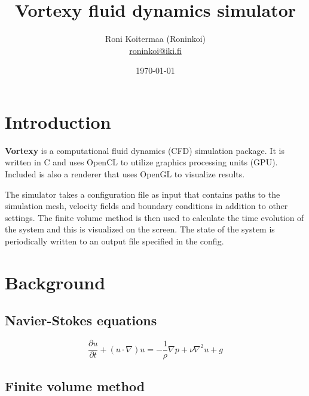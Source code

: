 \documentclass[12pt]{article}
\title {
  Vortexy fluid dynamics simulator
}
\date{\today}
\author {
  Roni Koitermaa (Roninkoi) \\
  \href{mailto:roninkoi@iki.fi}{roninkoi@iki.fi}
}
\begin{document}
\setlength{\belowcaptionskip}{10pt}


\normalsize

\maketitle

\newpage

\tableofcontents

\newpage

\section{Introduction}

{\bf Vortexy} is a computational fluid dynamics (CFD) simulation package. It is written in C and uses OpenCL to utilize graphics processing units (GPU). Included is also a renderer that uses OpenGL to visualize results.

The simulator takes a configuration file as input that contains paths to the simulation mesh, velocity fields and boundary conditions in addition to other settings. The finite volume method is then used to calculate the time evolution of the system and this is visualized on the screen. The state of the system is periodically written to an output file specified in the config.


\section{Background}

\subsection{Navier-Stokes equations}

\begin{equation}
  \frac{\partial u}{\partial t} + (u \cdot \nabla) u = -\frac{1}{\rho} \nabla p + \nu \nabla^2 u + g
\end{equation}

\subsection{Finite volume method}
\end{document}
